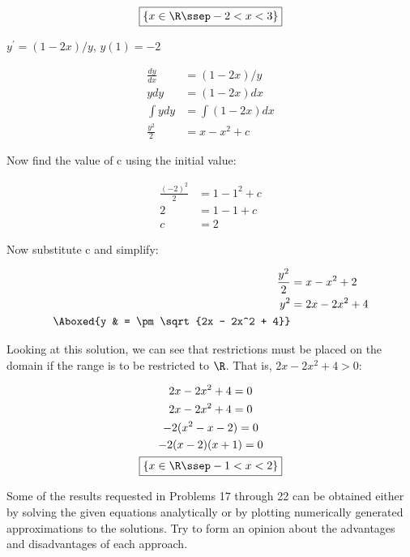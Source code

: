 \documentclass{lapchomework}
\begin{document}
\begin{problems}
\begin{solution}
\step \begin{gather*}
\boxed{\{x \in \R \ssep -2 < x < 3\}} 
\end{gather*}

\end{solution}

\problem [10] $y^{\prime} = (1-2x)/y$, $y(1) = -2$

\begin{solution}

\step \begin{align*}
\frac{dy}{dx} & = (1-2x)/y \\
y dy &= (1-2x)dx \\
\int y dy & = \int (1-2x)dx \\
\frac{y^2}{2} & = x - x^2 + c
\end{align*}

\step Now find the value of c using the initial value:

\step \begin{align*}
\frac{(-2)^2}{2} & = 1 - 1^2 + c \\
2 & = 1 - 1 + c \\
c & = 2 
\end{align*}

\step Now substitute c and simplify:

\step \begin{align*}
\frac{y^2}{2} & = x - x^2 + 2 \\
y^2 & = 2x - 2x^2 + 4 \\
\Aboxed{y & = \pm \sqrt{2x - 2x^2 + 4}}
\end{align*}

\step Looking at this solution, we can see that restrictions must be placed
on the domain if the range is to be restricted to $\R$. That is, $2x - 2x^2
+ 4 > 0$:

\step \begin{gather*}
2x - 2x^2 + 4 = 0 \\
2x - 2x^2 + 4 = 0 \\
-2(x^2-x-2) = 0 \\
-2(x-2)(x+1) = 0 \\
\boxed{\{x \in \R \ssep -1 < x < 2\}}
\end{gather*}

\end{solution}

\end{problems}

\begin{instructions}
Some of the results requested in Problems 17 through 22 can be
obtained either by solving the given equations analytically or by
plotting numerically generated approximations to the solutions. Try
to form an opinion about the advantages and disadvantages of each
approach.
\end{instructions}
\end{document}
